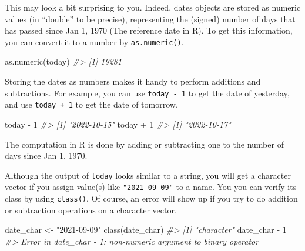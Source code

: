 \documentclass[
]{book}
\newenvironment{Shaded}{\begin{snugshade}}{\end{snugshade}}
\newcommand{\CommentTok}[1]{\textcolor[rgb]{0.56,0.35,0.01}{\textit{#1}}}
\newcommand{\DecValTok}[1]{\textcolor[rgb]{0.00,0.00,0.81}{#1}}
\newcommand{\FunctionTok}[1]{\textcolor[rgb]{0.00,0.00,0.00}{#1}}
\newcommand{\NormalTok}[1]{#1}
\newcommand{\OtherTok}[1]{\textcolor[rgb]{0.56,0.35,0.01}{#1}}
\newcommand{\SpecialCharTok}[1]{\textcolor[rgb]{0.00,0.00,0.00}{#1}}
\newcommand{\StringTok}[1]{\textcolor[rgb]{0.31,0.60,0.02}{#1}}
\newenvironment{blackbox}{
  \definecolor{shadecolor}{rgb}{0, 0, 0}  %
  \color{white}
  \begin{shaded}}
 {\end{shaded}}
\newenvironment{infobox}[1]
  {
  \begin{itemize}
  \renewcommand{\labelitemi}{
    \raisebox{-.7\height}[0pt][0pt]{
      {\setkeys{Gin}{width=3em,keepaspectratio}
        \texttt{[image: pics/\#1]}}
    }
  }
  \setlength{\fboxsep}{1em}
  \begin{blackbox}
  \item
  }
  {
  \end{blackbox}
  \end{itemize}
  }
\begin{document}
This may look a bit surprising to you. Indeed, dates objects are stored as numeric values (in ``double'' to be precise), representing the (signed) number of days that has passed since Jan 1, 1970 (The reference date in R). To get this information, you can convert it to a number by \texttt{as.numeric()}.

\begin{Shaded}
\begin{Highlighting}[]
\FunctionTok{as.numeric}\NormalTok{(today)}
\CommentTok{\#\textgreater{} [1] 19281}
\end{Highlighting}
\end{Shaded}

Storing the dates as numbers makes it handy to perform additions and subtractions. For example, you can use \texttt{today\ -\ 1} to get the date of yesterday, and use \texttt{today\ +\ 1} to get the date of tomorrow.

\begin{Shaded}
\begin{Highlighting}[]
\NormalTok{today }\SpecialCharTok{{-}} \DecValTok{1}
\CommentTok{\#\textgreater{} [1] "2022{-}10{-}15"}
\NormalTok{today }\SpecialCharTok{+} \DecValTok{1}
\CommentTok{\#\textgreater{} [1] "2022{-}10{-}17"}
\end{Highlighting}
\end{Shaded}

The computation in R is done by adding or subtracting one to the number of days since Jan 1, 1970.

\begin{infobox}{caution}

Although the output of \texttt{today} looks similar to a string, you will get a character vector if you assign value(s) like \texttt{"2021-09-09"} to a name. You you can verify its class by using \texttt{class()}.
Of course, an error will show up if you try to do addition or subtraction operations on a character vector.

\begin{Shaded}
\begin{Highlighting}[]
\NormalTok{date\_char }\OtherTok{\textless{}{-}} \StringTok{"2021{-}09{-}09"}
\FunctionTok{class}\NormalTok{(date\_char)}
\CommentTok{\#\textgreater{} [1] "character"}
\NormalTok{date\_char }\SpecialCharTok{{-}} \DecValTok{1}
\CommentTok{\#\textgreater{} Error in date\_char {-} 1: non{-}numeric argument to binary operator}
\end{Highlighting}
\end{Shaded}

\end{infobox}
\end{document}
